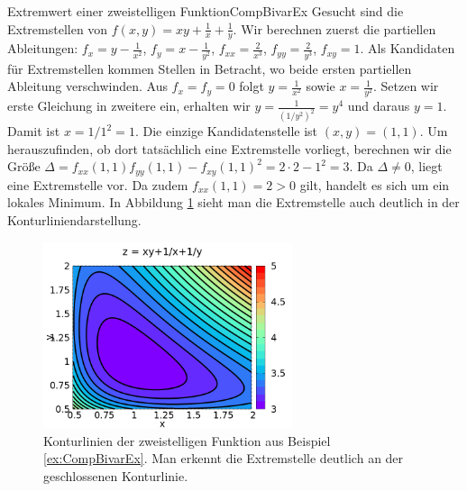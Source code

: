 \begin{example}{Extremwert einer zweistelligen Funktion}{CompBivarEx}
    Gesucht sind die Extremstellen von $f(x,y) = xy + \frac{1}{x} + \frac{1}{y}$. Wir berechnen zuerst die partiellen Ableitungen: $f_x = y-\frac{1}{x^2}$, $f_y = x-\frac{1}{y^2}$, $f_{xx} = \frac{2}{x^3}$, $f_{yy} = \frac{2}{y^3}$, $f_{xy} = 1$. Als Kandidaten für Extremstellen kommen Stellen in Betracht, wo beide ersten partiellen Ableitung verschwinden. Aus $f_x = f_y = 0$ folgt $y=\frac{1}{x^2}$ sowie $x=\frac{1}{y^2}$. Setzen wir erste Gleichung in zweitere ein, erhalten wir $y=\frac{1}{\left(1/y^2\right)^2} = y^4$ und daraus $y=1$. Damit ist $x=1/1^2 = 1$. Die einzige Kandidatenstelle ist $(x,y) =(1,1)$. Um herauszufinden, ob dort tatsächlich eine Extremstelle vorliegt, berechnen wir die Größe $\Delta = f_{xx}(1,1)f_{yy}(1,1) - f_{xy}(1,1)^2 = 2\cdot2 - 1^2 = 3$. Da $\Delta \ne 0$, liegt eine Extremstelle vor. Da zudem $f_{xx}(1,1) = 2 > 0$ gilt, handelt es sich um ein lokales Minimum. In Abbildung \ref{fig:ExCompBivarEx} sieht man die Extremstelle auch deutlich in der Konturliniendarstellung.
\end{example}

\begin{figure}
    \centering
    \includegraphics[width=0.65\textwidth]{./gnuplot/contour-field-extrem-values}
    \caption{Konturlinien der zweistelligen Funktion aus Beispiel \ref{ex:CompBivarEx}. Man erkennt die Extremstelle deutlich an der geschlossenen Konturlinie.}
    \label{fig:ExCompBivarEx}
\end{figure}
